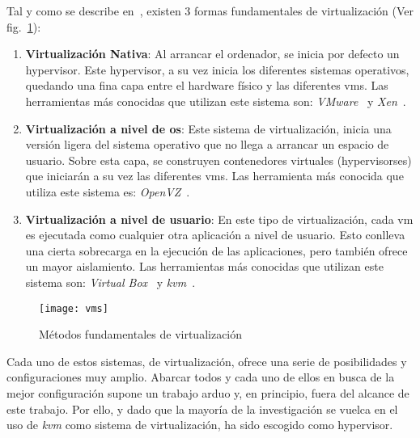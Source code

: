 Tal y como se describe en~\cite{schlosser2011performance}, existen 3 formas fundamentales de virtualización (Ver fig.~\ref{fig:ea:vm}):

\begin{enumerate}
\item \textbf{Virtualización Nativa}: Al arrancar el ordenador, se inicia por defecto un \gls{hypervisor}. Este \gls{hypervisor}, a su vez inicia los diferentes sistemas operativos, quedando una fina capa entre el hardware físico y las diferentes \glspl{vm}. Las herramientas más conocidas que utilizan este sistema son: \textit{VMware}~\cite{bib:vmware} y \textit{Xen}~\cite{bib:xen}.
\item \textbf{Virtualización a nivel de \gls{os}}: Este sistema de virtualización, inicia una versión ligera del sistema operativo que no llega a arrancar un espacio de usuario. Sobre esta capa, se construyen contenedores virtuales (\glspl{hypervisor}es) que iniciarán a su vez las diferentes \glspl{vm}. Las herramienta más conocida que utiliza este sistema es: \textit{OpenVZ}~\cite{bib:openvz}.
\item \textbf{Virtualización a nivel de usuario}: En este tipo de virtualización, cada \gls{vm} es ejecutada como cualquier otra aplicación a nivel de usuario. Esto conlleva una cierta sobrecarga en la ejecución de las aplicaciones, pero también ofrece un mayor aislamiento. Las herramientas más conocidas que utilizan este sistema son: \textit{Virtual Box}~\cite{bib:virtualbox} y \textit{\gls{kvm}}~\cite{bib:kvm}.
\end{enumerate}

\begin{figure}[!bth]
\centering
\texttt{[image: vms]}
\caption{Métodos fundamentales de virtualización}
\label{fig:ea:vm}
\end{figure}

Cada uno de estos sistemas, de virtualización, ofrece una serie de posibilidades y configuraciones muy amplio. Abarcar todos y cada uno de ellos en busca de la mejor configuración supone un trabajo arduo y, en principio, fuera del alcance de este trabajo. Por ello, y dado que la mayoría de la investigación se vuelca en el uso de \textit{\gls{kvm}} como sistema de virtualización, ha sido escogido como \gls{hypervisor}.

